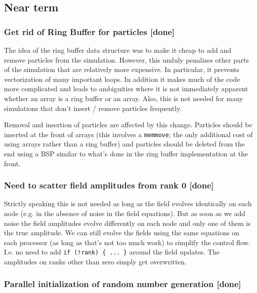 \documentclass[aps, superscriptaddress, groupedaddress, preprint]{revtex4}
\begin{document}
\subsection{Near term}

\subsubsection{Get rid of Ring Buffer for particles {\bf [done]}}

The idea of the ring buffer data structure was to make it cheap
to add and remove particles from the simulation.  However, this
unduly penalizes other parts of the simulation that are
relatively more expensive.  In particular, it prevents
vectorization of many important loops.  In addition it makes much
of the code more complicated and leads to ambiguities where it is
not immediately apparent whether an array is a ring buffer or an
array.  Also, this is not needed for many simulations that don't
insert / remove particles frequently.

Removal and insertion of particles are affected by this change.
Particles should be inserted at the front of arrays (this
involves a \verb~memmove~; the only additional cost of using
arrays rather than a ring buffer) and particles should be deleted
from the end using a BSP similar to what's done in the ring
buffer implementation at the front.


\subsubsection{Need to scatter field amplitudes from rank 0 {\bf
[done]}}

Strictly speaking this is not needed as long as the field evolves
identically on each node (e.g. in the absence of noise in the
field equations).  But as soon as we add noise the field
amplitudes evolve differently on each node and only one of them
is the true amplitude.  We can still evolve the fields using the
same equations on each processor (as long as that's not too much
work) to simplify the control flow.  I.e. no need to add 
\verb~if (!rank) { ... }~ around the field updates.  The
amplitudes on ranks other than zero simply get overwritten.


\subsubsection{Parallel initialization of random number
generation {\bf [done]}}
\end{document}
